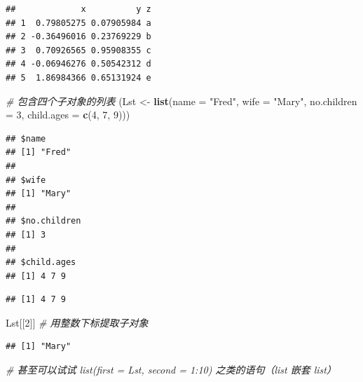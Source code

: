 \documentclass[
  b5paper,
  UTF8,twoside]{book}
\newenvironment{Shaded}{\begin{snugshade}}{\end{snugshade}}
\newcommand{\AttributeTok}[1]{\textcolor[rgb]{0.13,0.29,0.53}{#1}}
\newcommand{\CommentTok}[1]{\textcolor[rgb]{0.56,0.35,0.01}{\textit{#1}}}
\newcommand{\DecValTok}[1]{\textcolor[rgb]{0.00,0.00,0.81}{#1}}
\newcommand{\FunctionTok}[1]{\textcolor[rgb]{0.13,0.29,0.53}{\textbf{#1}}}
\newcommand{\NormalTok}[1]{#1}
\newcommand{\OtherTok}[1]{\textcolor[rgb]{0.56,0.35,0.01}{#1}}
\newcommand{\SpecialCharTok}[1]{\textcolor[rgb]{0.81,0.36,0.00}{\textbf{#1}}}
\newcommand{\StringTok}[1]{\textcolor[rgb]{0.31,0.60,0.02}{#1}}
\begin{document}
\begin{verbatim}
##             x          y z
## 1  0.79805275 0.07905984 a
## 2 -0.36496016 0.23769229 b
## 3  0.70926565 0.95908355 c
## 4 -0.06946276 0.50542312 d
## 5  1.86984366 0.65131924 e
\end{verbatim}

\begin{Shaded}
\begin{Highlighting}[]
\CommentTok{\# 包含四个子对象的列表}
\NormalTok{(Lst }\OtherTok{\textless{}{-}} \FunctionTok{list}\NormalTok{(}\AttributeTok{name =} \StringTok{"Fred"}\NormalTok{, }\AttributeTok{wife =} \StringTok{"Mary"}\NormalTok{, }\AttributeTok{no.children =} \DecValTok{3}\NormalTok{, }\AttributeTok{child.ages =} \FunctionTok{c}\NormalTok{(}\DecValTok{4}\NormalTok{, }\DecValTok{7}\NormalTok{, }\DecValTok{9}\NormalTok{)))}
\end{Highlighting}
\end{Shaded}

\begin{verbatim}
## $name
## [1] "Fred"
## 
## $wife
## [1] "Mary"
## 
## $no.children
## [1] 3
## 
## $child.ages
## [1] 4 7 9
\end{verbatim}

\begin{Shaded}
\end{Shaded}

\begin{verbatim}
## [1] 4 7 9
\end{verbatim}

\begin{Shaded}
\begin{Highlighting}[]
\NormalTok{Lst[[}\DecValTok{2}\NormalTok{]] }\CommentTok{\# 用整数下标提取子对象}
\end{Highlighting}
\end{Shaded}

\begin{verbatim}
## [1] "Mary"
\end{verbatim}

\begin{Shaded}
\begin{Highlighting}[]
\CommentTok{\# 甚至可以试试 list(first = Lst, second = 1:10) 之类的语句（list 嵌套 list）}
\end{Highlighting}
\end{Shaded}
\end{document}

